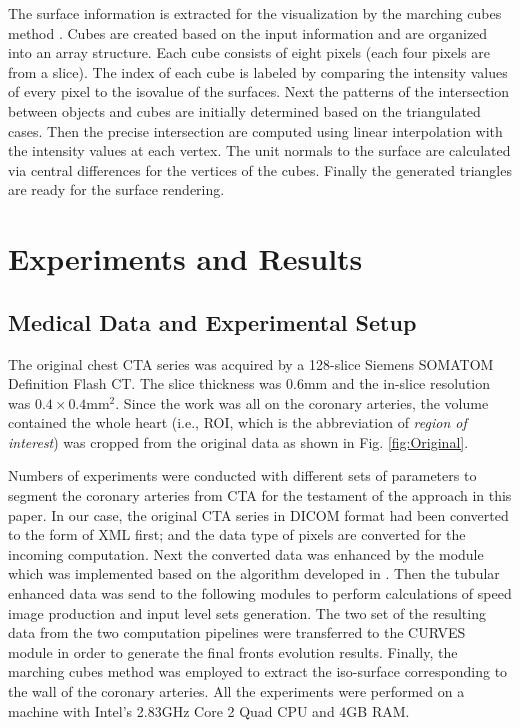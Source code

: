 The surface information is extracted for the visualization by the marching cubes method \cite{Lorensen1987MC}.
Cubes are created based on the input information and are organized into an array structure.
Each cube consists of eight pixels (each four pixels are from a slice).
The index of each cube is labeled by comparing the intensity values of every pixel to the isovalue of the surfaces.
Next the patterns of the intersection between objects and cubes are initially determined based on the triangulated cases.
Then the precise intersection are computed using linear interpolation with the intensity values at each vertex.
The unit normals to the surface are calculated via central differences for the vertices of the cubes.
Finally the generated triangles are ready for the surface rendering.

\section{Experiments and Results}

\subsection{Medical Data and Experimental Setup}

The original chest CTA series was acquired by a 128-slice Siemens SOMATOM Definition Flash CT.
The slice thickness was $0.6 \text{mm}$ and the in-slice resolution was $0.4 \times 0.4 \text{mm}^2$.
Since the work was all on the coronary arteries, the volume contained the whole heart (i.e., ROI, which is the abbreviation of \textit{region of interest}) was cropped from the original data as shown in Fig. \ref{fig:Original}. %

Numbers of experiments were conducted with different sets of parameters to segment the coronary arteries from CTA for the testament of the approach in this paper.
In our case, the original CTA series in DICOM format had been converted to the form of XML first; and the data type of pixels are converted for the incoming computation.
Next the converted data was enhanced by the module which was implemented based on the algorithm developed in \cite{Sato1998}.
Then the tubular enhanced data was send to the following modules to perform calculations of speed image production and input level sets generation.
The two set of the resulting data from the two computation pipelines were transferred to the CURVES module in order to generate the final fronts evolution results.
Finally, the marching cubes method was employed to extract the iso-surface corresponding to the wall of the coronary arteries.
All the experiments were performed on a machine with Intel's 2.83GHz Core 2 Quad CPU and 4GB RAM.


